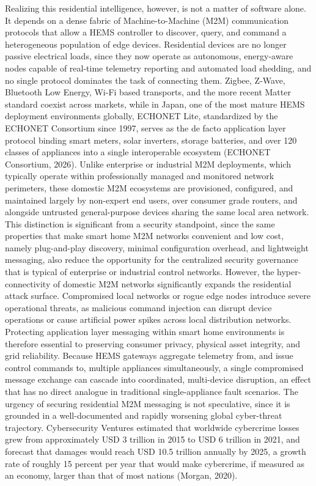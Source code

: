 Realizing this residential intelligence, however, is not a matter of software alone. It depends on a dense fabric of Machine-to-Machine (M2M) communication protocols that allow a HEMS controller to discover, query, and command a heterogeneous population of edge devices. Residential devices are no longer passive electrical loads, since they now operate as autonomous, energy-aware nodes capable of real-time telemetry reporting and automated load shedding, and no single protocol dominates the task of connecting them. Zigbee, Z-Wave, Bluetooth Low Energy, Wi-Fi based transports, and the more recent Matter standard coexist across markets, while in Japan, one of the most mature HEMS deployment environments globally, ECHONET Lite, standardized by the ECHONET Consortium since 1997, serves as the de facto application layer protocol binding smart meters, solar inverters, storage batteries, and over 120 classes of appliances into a single interoperable ecosystem (ECHONET Consortium, 2026). Unlike enterprise or industrial M2M deployments, which typically operate within professionally managed and monitored network perimeters, these domestic M2M ecosystems are provisioned, configured, and maintained largely by non-expert end users, over consumer grade routers, and alongside untrusted general-purpose devices sharing the same local area network. This distinction is significant from a security standpoint, since the same properties that make smart home M2M networks convenient and low cost, namely plug-and-play discovery, minimal configuration overhead, and lightweight messaging, also reduce the opportunity for the centralized security governance that is typical of enterprise or industrial control networks.
However, the hyper-connectivity of domestic M2M networks significantly expands the residential attack surface. Compromised local networks or rogue edge nodes introduce severe operational threats, as malicious command injection can disrupt device operations or cause artificial power spikes across local distribution networks. Protecting application layer messaging within smart home environments is therefore essential to preserving consumer privacy, physical asset integrity, and grid reliability. Because HEMS gateways aggregate telemetry from, and issue control commands to, multiple appliances simultaneously, a single compromised message exchange can cascade into coordinated, multi-device disruption, an effect that has no direct analogue in traditional single-appliance fault scenarios.
The urgency of securing residential M2M messaging is not speculative, since it is grounded in a well-documented and rapidly worsening global cyber-threat trajectory. Cybersecurity Ventures estimated that worldwide cybercrime losses grew from approximately USD 3 trillion in 2015 to USD 6 trillion in 2021, and forecast that damages would reach USD 10.5 trillion annually by 2025, a growth rate of roughly 15 percent per year that would make cybercrime, if measured as an economy, larger than that of most nations (Morgan, 2020).

